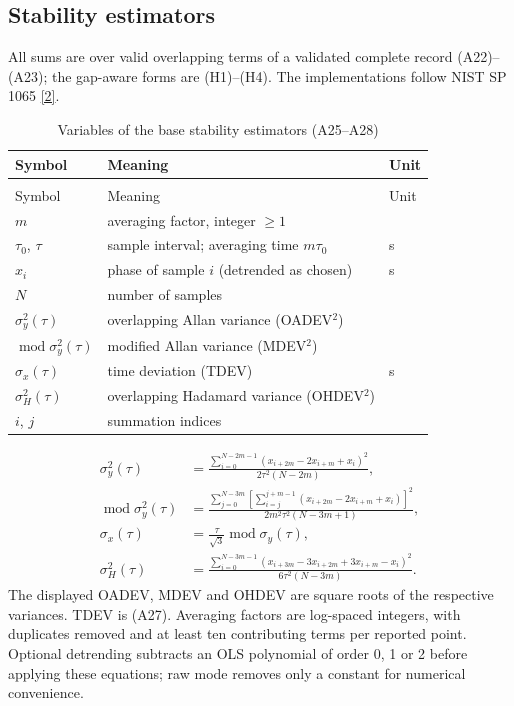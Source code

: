 \documentclass[11pt,a4paper]{article}
\makeatletter
\newcommand{\nist}{\href{https://tf.nist.gov/general/pdf/2220.pdf}{[2]}}
\renewcommand{\_}{\usscore\allowbreak}
\newenvironment{vartable}[2]{%
 \par\small\setlength{\LTpre}{3pt}\setlength{\LTpost}{3pt}%
 \begin{longtable}{@{}>{\raggedright}p{.2\linewidth}>{\raggedright}p{.57\linewidth}>{\raggedright\arraybackslash}p{.17\linewidth}@{}}
 \caption{#2}\label{#1}\\
 \toprule Symbol & Meaning & Unit\\\midrule
 \endfirsthead
 \multicolumn{3}{@{}l}{\footnotesize\itshape Table \thetable{} (continued)}\\
 \toprule Symbol & Meaning & Unit\\\midrule
 \endhead
 \bottomrule
 \endlastfoot}
 {\end{longtable}\normalsize}
\makeatother
\begin{document}
\subsection{Stability estimators}
All sums are over valid overlapping terms of a validated complete record (A22)--(A23); the
gap-aware forms are (H1)--(H4). The implementations follow NIST SP 1065 \nist.
\begin{vartable}{tab:var-A5}{Variables of the base stability estimators (A25--A28)}
\(m\) & averaging factor, integer \(\ge1\) & 1\\
\(\tau_0\), \(\tau\) & sample interval; averaging time \(m\tau_0\) & s\\
\(x_i\) & phase of sample \(i\) (detrended as chosen) & s\\
\(N\) & number of samples & 1\\
\(\sigma_y^2(\tau)\) & overlapping Allan variance (OADEV\(^2\)) & 1\\
\(\operatorname{mod}\sigma_y^2(\tau)\) & modified Allan variance (MDEV\(^2\)) & 1\\
\(\sigma_x(\tau)\) & time deviation (TDEV) & s\\
\(\sigma_H^2(\tau)\) & overlapping Hadamard variance (OHDEV\(^2\)) & 1\\
\(i\), \(j\) & summation indices & 1\\
\end{vartable}
\begin{align}
\sigma_y^2(\tau)&=
\frac{\sum_{i=0}^{N-2m-1}(x_{i+2m}-2x_{i+m}+x_i)^2}
     {2\tau^2(N-2m)}, \tag{A25}\label{eq:A25}\\
\operatorname{mod}\sigma_y^2(\tau)&=
\frac{\displaystyle\sum_{j=0}^{N-3m}
 \left[\sum_{i=j}^{j+m-1}(x_{i+2m}-2x_{i+m}+x_i)\right]^2}
 {2m^2\tau^2(N-3m+1)}, \tag{A26}\label{eq:A26}\\
\sigma_x(\tau)&=\frac{\tau}{\sqrt3}\operatorname{mod}\sigma_y(\tau), \tag{A27}\label{eq:A27}\\
\sigma_H^2(\tau)&=
\frac{\displaystyle\sum_{i=0}^{N-3m-1}
(x_{i+3m}-3x_{i+2m}+3x_{i+m}-x_i)^2}
{6\tau^2(N-3m)}. \tag{A28}\label{eq:A28}
\end{align}
The displayed OADEV, MDEV and OHDEV are square roots of the respective
variances. TDEV is (A27). Averaging factors are log-spaced integers, with
duplicates removed and at least ten contributing terms per reported point.
Optional detrending subtracts an OLS polynomial of order 0, 1 or 2 before
applying these equations; raw mode removes only a constant for numerical
convenience.
\clearpage
\end{document}
